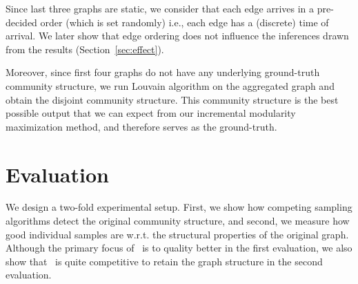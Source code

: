 Since last three graphs are static, we consider that each edge arrives in a pre-decided order (which is set randomly) i.e., each edge has a (discrete) time of arrival. We later show that edge ordering does not influence the inferences drawn from the results (Section~\ref{sec:effect}).

Moreover, since first four graphs do not have any underlying ground-truth community structure, we run Louvain algorithm \cite{blondel2008fast} on the aggregated graph and obtain the disjoint community structure. This community structure is the best possible output that we can expect from our incremental modularity maximization method, and therefore serves as the ground-truth. 

\section{Evaluation}
We design a two-fold experimental setup. First, we show how  competing sampling algorithms detect the original community structure, and second, we measure how good individual samples are w.r.t. the structural properties of the original graph. Although the primary focus of \compas~is to quality better in the first evaluation, we also show that \compas~is quite competitive to retain the graph structure in the second evaluation.


